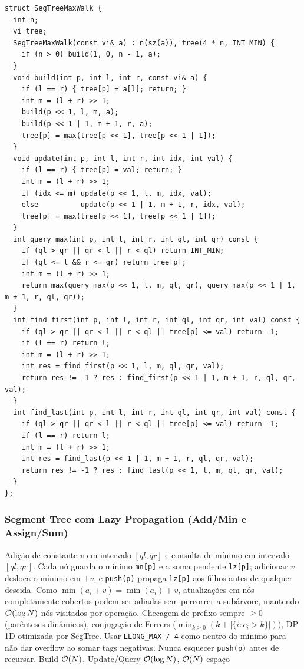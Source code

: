 \begin{lstlisting}
struct SegTreeMaxWalk {
  int n;
  vi tree;
  SegTreeMaxWalk(const vi& a) : n(sz(a)), tree(4 * n, INT_MIN) {
    if (n > 0) build(1, 0, n - 1, a);
  }
  void build(int p, int l, int r, const vi& a) {
    if (l == r) { tree[p] = a[l]; return; }
    int m = (l + r) >> 1;
    build(p << 1, l, m, a);
    build(p << 1 | 1, m + 1, r, a);
    tree[p] = max(tree[p << 1], tree[p << 1 | 1]);
  }
  void update(int p, int l, int r, int idx, int val) {
    if (l == r) { tree[p] = val; return; }
    int m = (l + r) >> 1;
    if (idx <= m) update(p << 1, l, m, idx, val);
    else          update(p << 1 | 1, m + 1, r, idx, val);
    tree[p] = max(tree[p << 1], tree[p << 1 | 1]);
  }
  int query_max(int p, int l, int r, int ql, int qr) const {
    if (ql > qr || qr < l || r < ql) return INT_MIN;
    if (ql <= l && r <= qr) return tree[p];
    int m = (l + r) >> 1;
    return max(query_max(p << 1, l, m, ql, qr), query_max(p << 1 | 1, m + 1, r, ql, qr));
  }
  int find_first(int p, int l, int r, int ql, int qr, int val) const {
    if (ql > qr || qr < l || r < ql || tree[p] <= val) return -1;
    if (l == r) return l;
    int m = (l + r) >> 1;
    int res = find_first(p << 1, l, m, ql, qr, val);
    return res != -1 ? res : find_first(p << 1 | 1, m + 1, r, ql, qr, val);
  }
  int find_last(int p, int l, int r, int ql, int qr, int val) const {
    if (ql > qr || qr < l || r < ql || tree[p] <= val) return -1;
    if (l == r) return l;
    int m = (l + r) >> 1;
    int res = find_last(p << 1 | 1, m + 1, r, ql, qr, val);
    return res != -1 ? res : find_last(p << 1, l, m, ql, qr, val);
  }
};
\end{lstlisting}

\subsubsection{Segment Tree com Lazy Propagation (Add/Min e Assign/Sum)}
\algobox
  {Adição de constante $v$ em intervalo $[ql, qr]$ e consulta de mínimo em intervalo $[ql, qr]$.}
  {Cada nó guarda o mínimo \texttt{mn[p]} e a soma pendente \texttt{lz[p]}; adicionar $v$ desloca o mínimo em $+v$, e \texttt{push(p)} propaga \texttt{lz[p]} aos filhos antes de qualquer descida.}
  {Como $\min(a_i + v) = \min(a_i) + v$, atualizações em nós completamente cobertos podem ser adiadas sem percorrer a subárvore, mantendo $\mathcal{O}(\log N)$ nós visitados por operação.}
  {Checagem de prefixo sempre $\ge 0$ (parênteses dinâmicos), conjugação de Ferrers ($\min_{k \ge 0}(k + |\{i : c_i > k\}|)$), DP 1D otimizada por SegTree.}
  {Usar \texttt{LLONG\_MAX / 4} como neutro do mínimo para não dar overflow ao somar tags negativas. Nunca esquecer \texttt{push(p)} antes de recursar.}
  {Build $\mathcal{O}(N)$, Update/Query $\mathcal{O}(\log N)$, $\mathcal{O}(N)$ espaço}

